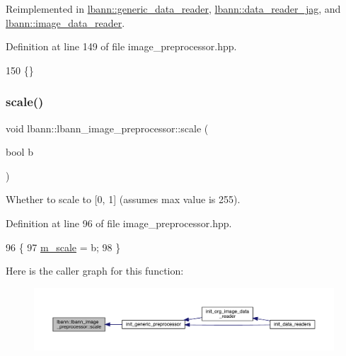 Reimplemented in \hyperlink{classlbann_1_1generic__data__reader_a8cf298061c73f55e2fe717acd2a9f178}{lbann\+::generic\+\_\+data\+\_\+reader}, \hyperlink{classlbann_1_1data__reader__jag_a396e7456d926ae9045011e7f28284946}{lbann\+::data\+\_\+reader\+\_\+jag}, and \hyperlink{classlbann_1_1image__data__reader_a71e4fa1eb8212cce88a2ed408ceeac51}{lbann\+::image\+\_\+data\+\_\+reader}.



Definition at line 149 of file image\+\_\+preprocessor.\+hpp.


\begin{DoxyCode}
150                                                 \{\}
\end{DoxyCode}
\mbox{\label{classlbann_1_1lbann__image__preprocessor_a977b2fdd417acb1eb37dbea0cfdd4b60}} 
\subsubsection{\texorpdfstring{scale()}{scale()}}
{\footnotesize\ttfamily void lbann\+::lbann\+\_\+image\+\_\+preprocessor\+::scale (\begin{DoxyParamCaption}\item[{bool}]{b }\end{DoxyParamCaption})\hspace{0.3cm}{\ttfamily [inline]}}

Whether to scale to \mbox{[}0, 1\mbox{]} (assumes max value is 255). 

Definition at line 96 of file image\+\_\+preprocessor.\+hpp.


\begin{DoxyCode}
96                      \{
97     \hyperlink{classlbann_1_1lbann__image__preprocessor_ae00af83d438ab27d6a7b996775fba3b3}{m\_scale} = b;
98   \}
\end{DoxyCode}
Here is the caller graph for this function\+:\nopagebreak
\begin{figure}[H]
\begin{center}
\leavevmode
\includegraphics[width=350pt]{classlbann_1_1lbann__image__preprocessor_a977b2fdd417acb1eb37dbea0cfdd4b60_icgraph}
\end{center}
\end{figure}
\mbox{\label{classlbann_1_1lbann__image__preprocessor_aef1e2375fd518e69df800b0dcbcb37d0}} 
